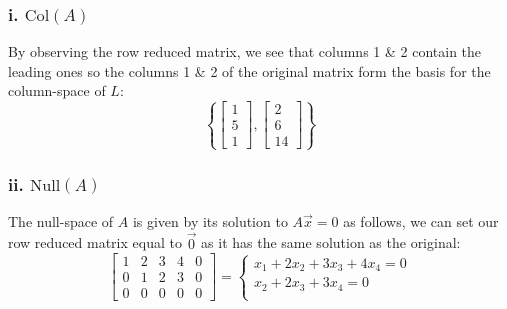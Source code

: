 \documentclass{article}
\begin{document}
\subsubsection*{i. \textit{$\text{Col}(A)$}}
By observing the row reduced matrix, we see that columns 1 \& 2 contain the leading ones so the columns 1 \& 2 of the original matrix form the basis for the column-space of $L$: $$\left\{\begin{bmatrix}
    1\\5\\1
\end{bmatrix},\begin{bmatrix}
    2\\6\\14
\end{bmatrix}\right\}$$

\subsubsection*{ii. \textit{$\text{Null}(A)$}}
The null-space of $A$ is given by its solution to $A\vec{x}=0$ as follows, we can set our row reduced matrix equal to $\vec{0}$ as it has the same solution as the original:
$$\left[\begin{array}{cccc|c}
    1&2&3&4&0\\
    0&1&2&3&0\\
    0&0&0&0&0
\end{array}\right]
=\begin{cases}
    x_1 +2x_2 +3x_3 +4x_4=0\\
    x_2 +2x_3 +3x_4=0\\
\end{cases}$$
\end{document}
